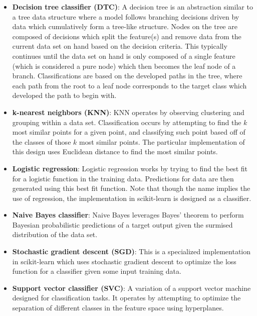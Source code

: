 \documentclass[10pt,sigconf,letterpaper,nonacm]{acmart}
\begin{document}
\begin{itemize}
  \item \textbf{Decision tree classifier (DTC)}: A decision tree is an abstraction similar to a tree data structure where a model follows branching decisions driven by data which cumulatively form a tree-like structure.
  Nodes on the tree are composed of decisions which split the feature(s) and remove data from the current data set on hand based on the decision criteria.
  This typically continues until the data set on hand is only composed of a single feature (which is considered a pure node) which then becomes the leaf node of a branch.
  Classifications are based on the developed paths in the tree, where each path from the root to a leaf node corresponds to the target class which developed the path to begin with.
  
  \item \textbf{k-nearest neighbors (KNN)}: KNN operates by observing clustering and grouping within a data set. Classification occurs by attempting to find the $k$ most similar points for a given point, and classifying such point based off of the classes of those $k$ most similar points.
  The particular implementation of this design uses Euclidean distance to find the most similar points.
  
  \item \textbf{Logistic regression}: Logistic regression works by trying to find the best fit for a logistic function in the training data.
  Predictions for data are then generated using this best fit function.
  Note that though the name implies the use of regression, the implementation in scikit-learn is designed as a classifier.
  
  \item \textbf{Naive Bayes classifier}: Naive Bayes leverages Bayes' theorem to perform Bayesian probabilistic predictions of a target output given the surmised distribution of the data set.
  
  \item \textbf{Stochastic gradient descent (SGD)}: This is a specialized implementation in scikit-learn which uses stochastic gradient descent to optimize the loss function for a classifier given some input training data. 
  
  \item \textbf{Support vector classifier (SVC)}: A variation of a support vector machine designed for classification tasks. It operates by attempting to optimize the separation of different classes in the feature space using hyperplanes.
\end{itemize}
\end{document}
